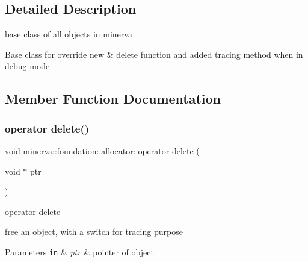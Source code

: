 \subsection{Detailed Description}
base class of all objects in minerva 

Base class for override new \& delete function and added tracing method when in debug mode 

\subsection{Member Function Documentation}
\mbox{\label{classminerva_1_1foundation_1_1allocator_ae33b6c28ecbd236c7e974ac9270601a8}} 
\subsubsection{\texorpdfstring{operator delete()}{operator delete()}}
{\footnotesize\ttfamily void minerva\+::foundation\+::allocator\+::operator delete (\begin{DoxyParamCaption}\item[{void $\ast$}]{ptr }\end{DoxyParamCaption})\hspace{0.3cm}{\ttfamily [inline]}}



operator delete 

free an object, with a switch for tracing purpose


\begin{DoxyParams}[1]{Parameters}
\mbox{\tt in}  & {\em ptr} & pointer of object \\
\hline
\end{DoxyParams}
\mbox{\label{classminerva_1_1foundation_1_1allocator_af693b0cd3bdec3bfdc4885b15f9d04c6}} 
